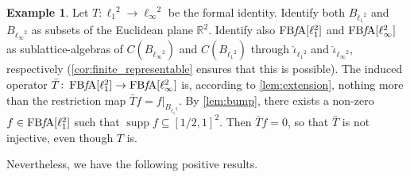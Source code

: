 \documentclass{memo-l}
\theoremstyle{definition}
\newtheorem{example}[theorem]{Example}
\theoremstyle{remark}
\numberwithin{section}{chapter}
\numberwithin{equation}{chapter}
\newcommand\R{\ensuremath{\mathbb{R}}}
\newcommand{\el}[1]{\ensuremath{\ell_{#1}}}
\newcommand{\FBFA}[1]{\operatorname{FB{\it f}\!A}[#1]}
\DeclareMathOperator{\supp}{supp}
\begin{document}
\begin{example}\label{ex:extension_of_bijection}
    Let $T\colon \el 1^{2}\to \el \infty ^2$ be the formal identity.
    Identify both $B_{\el 1^2}$ and $B_{\el \infty ^2}$ as subsets of
    the Euclidean plane $\R^2$. Identify also $\FBFA{\el 1^2}$ and
    $\FBFA{\el \infty ^2}$ as sublattice-algebras of $C(B_{\el \infty
    ^2})$ and $C(B_{\el 1^2})$ through $\hat{\iota }_{\el 1^2}$
    and $\hat{\iota }_{\el \infty ^2}$, respectively
    (\cref{cor:finite_representable} ensures that this is possible). The induced operator $\bar{T}\colon
    \FBFA{\el 1^2}\to \FBFA{\el \infty ^2}$ is, according to
    \cref{lem:extension}, nothing more than the restriction
    map $\bar{T}f=f|_{B_{\el 1^2}}$. By \cref{lem:bump},
    there exists a non-zero $f \in \FBFA{\el 1^2}$ such that $\supp f
    \subseteq [1/2,1]^2$. Then $\bar{T}f=0$, so that $\bar{T}$ is not
    injective, even though $T$ is.
\end{example}

Nevertheless, we have the following positive results.
\end{document}
